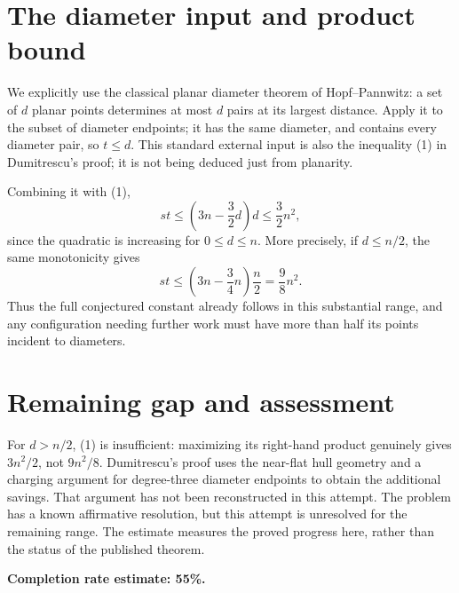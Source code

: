 \documentclass[11pt]{article}
\begin{document}
\section*{The diameter input and product bound}
We explicitly use the classical planar diameter theorem of Hopf--Pannwitz: a set of $d$ planar points determines at most $d$ pairs at its largest distance. Apply it to the subset of diameter endpoints; it has the same diameter, and contains every diameter pair, so $t\le d$. This standard external input is also the inequality (1) in Dumitrescu's proof; it is not being deduced just from planarity.

Combining it with (1),
\[
 st\le \left(3n-\frac32d\right)d\le\frac32n^2,
\]
since the quadratic is increasing for $0\le d\le n$. More precisely, if $d\le n/2$, the same monotonicity gives
\[
 st\le\left(3n-\frac34n\right)\frac n2=\frac98n^2.
\]
Thus the full conjectured constant already follows in this substantial range, and any configuration needing further work must have more than half its points incident to diameters.

\section*{Remaining gap and assessment}
For $d>n/2$, (1) is insufficient: maximizing its right-hand product genuinely gives $3n^2/2$, not $9n^2/8$. Dumitrescu's proof uses the near-flat hull geometry and a charging argument for degree-three diameter endpoints to obtain the additional savings. That argument has not been reconstructed in this attempt. The problem has a known affirmative resolution, but this attempt is unresolved for the remaining range. The estimate measures the proved progress here, rather than the status of the published theorem.

\textbf{Completion rate estimate: 55\%.}
\end{document}
